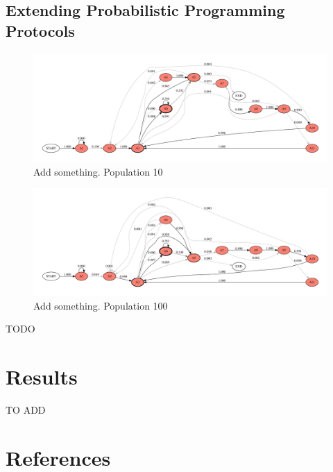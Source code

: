 \documentclass{article}
\begin{document}
\subsection{Extending Probabilistic Programming Protocols}

\begin{figure}[h!]
	\centering
	\includegraphics[width=\textwidth]{plots/ewan_25_pop_10.pdf}
	\caption{Add something. Population 10}
\end{figure}
\begin{figure}[h!]
	\centering
	\includegraphics[width=\textwidth]{plots/ewan_25_pop_100.pdf}
	\caption{Add something. Population 100}
\end{figure}
TODO

\section{Results}

TO ADD




\section*{References}



\end{document}
